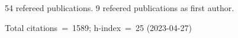 54 refereed publications. 9 refeered publications as first author.

Total citations~=~1589; h-index~=~25 (2023-04-27)